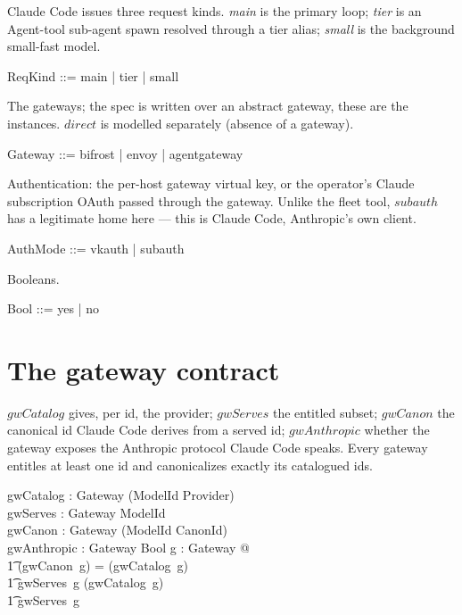 \documentclass{article}
\begin{document}
Claude Code issues three request kinds. \emph{main} is the primary loop;
\emph{tier} is an Agent-tool sub-agent spawn resolved through a tier alias;
\emph{small} is the background small-fast model.

\begin{zed}
  ReqKind ::= main | tier | small
\end{zed}

The gateways; the spec is written over an abstract gateway, these are the
instances. $direct$ is modelled separately (absence of a gateway).

\begin{zed}
  Gateway ::= bifrost | envoy | agentgateway
\end{zed}

Authentication: the per-host gateway virtual key, or the operator's Claude
subscription OAuth passed through the gateway. Unlike the fleet tool, $subauth$
has a legitimate home here --- this is Claude Code, Anthropic's own client.

\begin{zed}
  AuthMode ::= vkauth | subauth
\end{zed}

Booleans.

\begin{zed}
  Bool ::= yes | no
\end{zed}

\section{The gateway contract}

$gwCatalog$ gives, per id, the provider; $gwServes$ the entitled subset;
$gwCanon$ the canonical id Claude Code derives from a served id; $gwAnthropic$
whether the gateway exposes the Anthropic protocol Claude Code speaks. Every
gateway entitles at least one id and canonicalizes exactly its catalogued ids.

\begin{axdef}
  gwCatalog : Gateway \fun (ModelId \pfun Provider) \\
  gwServes : Gateway \fun \power ModelId \\
  gwCanon : Gateway \fun (ModelId \pfun CanonId) \\
  gwAnthropic : Gateway \fun Bool
\where
  \forall g : Gateway @ \\
  \t1 \dom (gwCanon~g) = \dom (gwCatalog~g) \land \\
  \t1 gwServes~g \subseteq \dom (gwCatalog~g) \land \\
  \t1 gwServes~g \neq \emptyset
\end{axdef}
\end{document}
